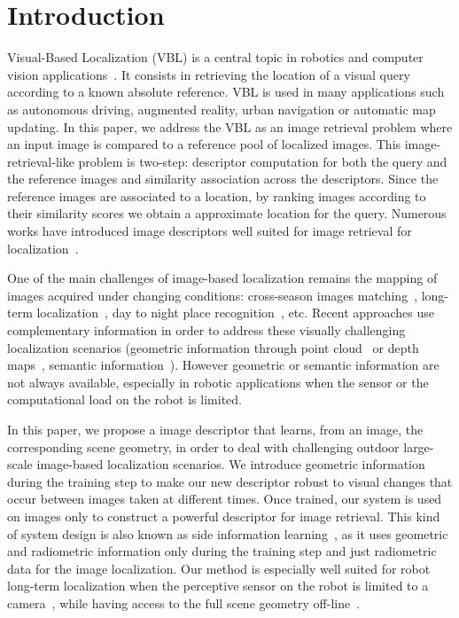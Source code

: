 \section{Introduction}
\label{sec:intro}

Visual-Based Localization (VBL) is a central topic in robotics and computer vision applications~\cite{Piasco2017}. It consists in retrieving the location of a visual query according to a known absolute reference. VBL is used in many applications such as autonomous driving, augmented reality, urban navigation or automatic map updating. In this paper, we address the VBL as an image retrieval problem where an input image is compared to a reference pool of localized images. This image-retrieval-like problem is two-step: descriptor computation for both the query and the reference images and similarity association across the descriptors. Since the reference images are associated to a location, by ranking images according to their similarity scores we obtain a approximate location for the query. Numerous works have introduced image descriptors well suited for image retrieval for localization~\cite{Arandjelovic2017,Kim2017a,Gordo2017,Radenovic2017,Liu2018}. 

One of the main challenges of image-based localization remains the mapping of images acquired under changing conditions: cross-season images matching~\cite{Naseer2017a}, long-term localization~\cite{Toft2018}, day to night place recognition~\cite{Torii2015}, etc. Recent approaches use complementary information in order to address these visually challenging localization scenarios (geometric information through point cloud~\cite{Sattler2018,Schonberger2018} or depth maps~\cite{Christie2016}, semantic information~\cite{Ardeshir2014,Christie2016,Naseer2017a}). However geometric or semantic information are not always available, especially in robotic applications when the sensor or the computational load on the robot is limited.

In this paper, we propose a image descriptor that learns, from an image, the corresponding scene geometry, in order to deal with challenging outdoor large-scale image-based localization scenarios. We introduce geometric information during the training step to make our new descriptor robust to visual changes that occur between images taken at different times. Once trained, our system is used on images only to construct a powerful descriptor for image retrieval. This kind of system design is also known as side information learning~\cite{Hoffman2016}, as it uses geometric and radiometric information only during the training step and just radiometric data for the image localization. Our method is especially well suited for robot long-term localization when the perceptive sensor on the robot is limited to a camera~\cite{Middelberg2014}, while having access to the full scene geometry off-line~\cite{Paparoditis2012,Maddern2016,Wang2016}. 

